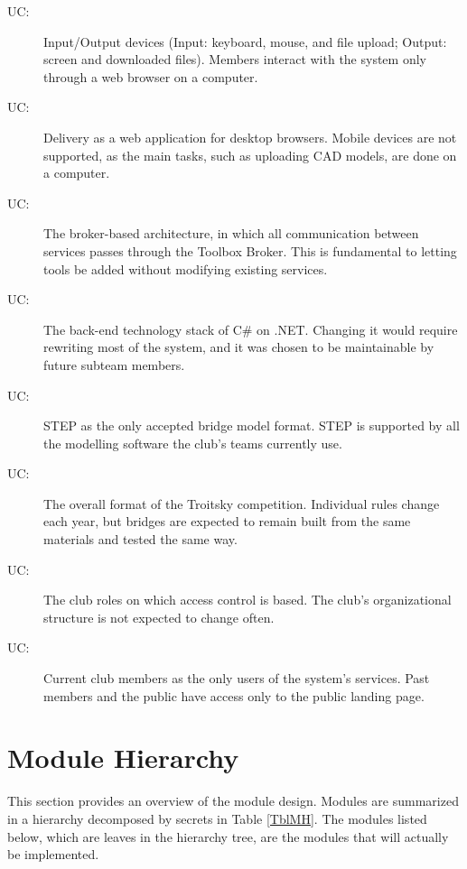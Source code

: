 \documentclass[12pt, titlepage]{article}
\newcounter{ucnum}
\newcommand{\uctheucnum}{UC\theucnum}
\begin{document}
\begin{description}
\item[ \uctheucnum \label{ucIO}:]
  Input/Output devices (Input: keyboard, mouse, and file upload; Output: screen and downloaded files). Members interact with the system only through a web browser on a computer.
\item[ \uctheucnum \label{ucPlatform}:]
  Delivery as a web application for desktop browsers. Mobile devices are not supported, as the main tasks, such as uploading CAD models, are done on a computer.
\item[ \uctheucnum \label{ucBroker}:]
  The broker-based architecture, in which all communication between services passes through the Toolbox Broker. This is fundamental to letting tools be added without modifying existing services.
\item[ \uctheucnum \label{ucStack}:]
  The back-end technology stack of C\# on .NET. Changing it would require rewriting most of the system, and it was chosen to be maintainable by future subteam members.
\item[ \uctheucnum \label{ucModelFormat}:]
  STEP as the only accepted bridge model format. STEP is supported by all the modelling software the club's teams currently use.
\item[ \uctheucnum \label{ucCompetition}:]
  The overall format of the Troitsky competition. Individual rules change each year, but bridges are expected to remain built from the same materials and tested the same way.
\item[ \uctheucnum \label{ucRoles}:]
  The club roles on which access control is based. The club's organizational structure is not expected to change often.
\item[ \uctheucnum \label{ucUsers}:]
  Current club members as the only users of the system's services. Past members and the public have access only to the public landing page.
\end{description}



\section{Module Hierarchy} \label{SecMH}

This section provides an overview of the module design. Modules are summarized
in a hierarchy decomposed by secrets in Table \ref{TblMH}. The modules listed
below, which are leaves in the hierarchy tree, are the modules that will
actually be implemented.
\end{document}
